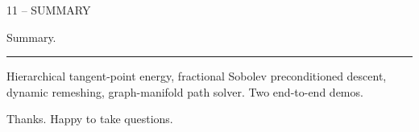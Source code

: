 \documentclass[aspectratio=169,14pt]{beamer}
\newcommand{\decklabel}[1]{%
  {\fontsize{8.5}{11}\selectfont\color{Label}\MakeUppercase{#1}\par}%
}
\newcommand{\slidetitle}[1]{%
  {\fontsize{25}{30}\selectfont\color{Text}\raggedright #1\par}%
}
\newcommand{\slidebody}[1]{%
  {\fontsize{12.2}{15.4}\selectfont\color{Dim}\raggedright #1\par}%
}
\newcommand{\thinrule}{%
  \par\vspace{0.24cm}%
  {\color{Rule}\rule{2.45cm}{0.35pt}}%
  \par\vspace{0.25cm}%
}
\begin{document}
\begin{frame}[plain]
  \vspace*{0.82cm}
  \hspace*{1.22cm}
  \begin{minipage}{0.78\paperwidth}
  \raggedright
  \decklabel{11 -- Summary}
  \vspace{0.54cm}
  \slidetitle{Summary.}
  \thinrule
  \slidebody{Hierarchical tangent-point energy, fractional Sobolev preconditioned descent, dynamic remeshing, graph-manifold path solver. Two end-to-end demos.}
  \vspace{0.40cm}
  \slidebody{Thanks. Happy to take questions.}
  \end{minipage}
\end{frame}
\end{document}
